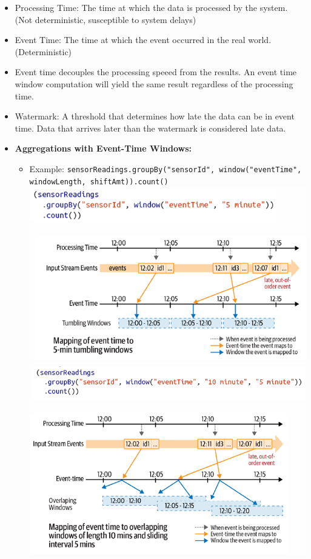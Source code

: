 \documentclass[10pt, landscape]{article}
\begin{document}
\begin{multicols*}{4}
\begin{itemize}
\begin{itemize}
            \item Processing Time: The time at which the data is processed by the system. (Not deterministic, susceptible to system delays)
            \item Event Time: The time at which the event occurred in the real world. (Deterministic)
            \item Event time decouples the processing speeed from the results. An event time window computation will yield the same result regardless of the processing time.
            \item Watermark: A threshold that determines how late the data can be in event time. Data that arrives later than the watermark is considered late data.
            
            \item \textbf{Aggregations with Event-Time Windows:}
                \begin{itemize}
                  \item Example: \texttt{sensorReadings.groupBy("sensorId", window("eventTime", windowLength, shiftAmt)).count()}
                  \includegraphics[width=0.95\linewidth]{event_time_no_overlap.png}
                  \includegraphics[width=0.95\linewidth]{event_time_overlap.png}

\end{itemize}
\end{itemize}
\end{itemize}
\end{multicols*}
\end{document}
